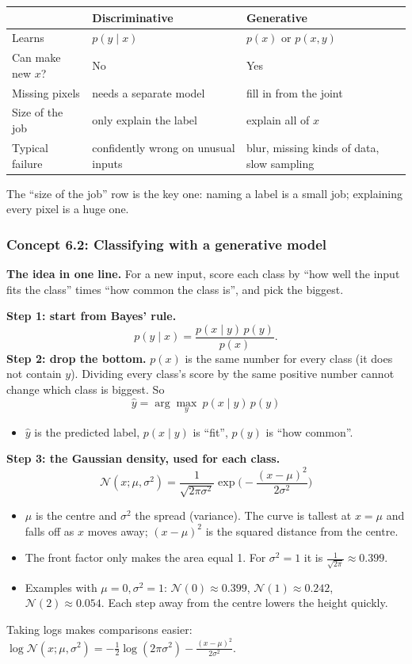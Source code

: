 \documentclass[12pt,a4paper]{article}
\begin{document}
\begin{center}
\begin{tabular}{@{}>{\raggedright\arraybackslash}p{}>{\raggedright\arraybackslash}p{}>{\raggedright\arraybackslash}p{}@{}}
\toprule
 & Discriminative & Generative \\
\midrule
Learns & $p(y\mid x)$ & $p(x)$ or $p(x,y)$ \\
Can make new $x$? & No & Yes \\
Missing pixels & needs a separate model & fill in from the joint \\
Size of the job & only explain the label & explain all of $x$ \\
Typical failure & confidently wrong on unusual inputs & blur, missing kinds of data, slow sampling \\
\bottomrule
\end{tabular}
\end{center}
The ``size of the job'' row is the key one: naming a label is a small job; explaining every pixel is a huge one.

\subsubsection{Concept 6.2: Classifying with a generative model}\label{c6-2}

\textbf{The idea in one line.} For a new input, score each class by ``how well the input fits the class'' times ``how common the class is'', and pick the biggest.

\textbf{Step 1: start from Bayes' rule.}
\[
p(y\mid x)=\frac{p(x\mid y)\,p(y)}{p(x)} .
\]
\textbf{Step 2: drop the bottom.} $p(x)$ is the same number for every class (it does not contain $y$). Dividing every class's score by the same positive number cannot change which class is biggest. So
\[
\hat y=\arg\max_y\ p(x\mid y)\,p(y)
\]
\begin{itemize}[nosep]
  \item $\hat y$ is the predicted label, $p(x\mid y)$ is ``fit'', $p(y)$ is ``how common''.
\end{itemize}

\textbf{Step 3: the Gaussian density, used for each class.}
\[
\mathcal{N}(x;\mu,\sigma^2)=\frac{1}{\sqrt{2\pi\sigma^2}}\exp\!\Big(-\frac{(x-\mu)^2}{2\sigma^2}\Big)
\]
\begin{itemize}[nosep]
  \item $\mu$ is the centre and $\sigma^2$ the spread (variance). The curve is tallest at $x=\mu$ and falls off as $x$ moves away; $(x-\mu)^2$ is the squared distance from the centre.
  \item The front factor only makes the area equal 1. For $\sigma^2=1$ it is $\frac{1}{\sqrt{2\pi}}\approx0.399$.
  \item Examples with $\mu=0,\sigma^2=1$: $\mathcal{N}(0)\approx0.399$, $\mathcal{N}(1)\approx0.242$, $\mathcal{N}(2)\approx0.054$. Each step away from the centre lowers the height quickly.
\end{itemize}
Taking logs makes comparisons easier: $\log\mathcal{N}(x;\mu,\sigma^2)=-\frac12\log(2\pi\sigma^2)-\frac{(x-\mu)^2}{2\sigma^2}$.
\end{document}
